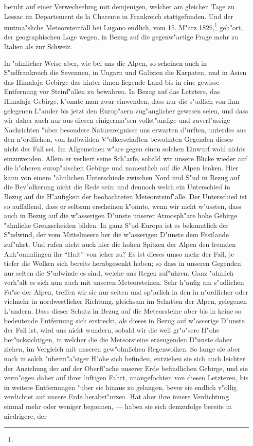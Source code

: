\documentclass[a4paper, 8pt, oneside, polutonikogreek, german]{article}
\begin{document}
beruht auf einer Verwechselung mit demjenigen, welcher am gleichen Tage zu Lessac im Departement de la Charente in Frankreich stattgefunden. Und der mutma"sliche Meteorsteinfall bei Lugano endlich, vom 15. M"arz 1826,\footnote{} geh"ort, der geographischen Lage wegen, in Bezug auf die gegenw"artige Frage mehr zu Italien als zur Schweiz.

In "ahnlicher Weise aber, wie bei uns die Alpen, so scheinen auch in S"udfrankreich die Sevennen, in Ungarn und Galizien die Karpaten, und in Asien das Himalaja-Gebirge das hinter ihnen liegende Land bis in eine gewisse Entfernung vor Steinf"allen zu bewahren. In Bezug auf das Letztere, das Himalaja-Gebirge, k"onnte man zwar einwenden, dass nur die s"udlich von ihm gelegenen L"ander bis jetzt den Europ"aern zug"anglicher gewesen seien, und dass wir daher auch nur aus diesen einigerma"sen vollst"andige und zuverl"assige Nachrichten "uber besondere Naturereignisse uns erwarten d"urften, unterdes aus den n"ordlichen, von halbwilden V"olkerschaften bewohnten Gegenden dieses nicht der Fall sei. Im Allgemeinen w"are gegen einen solchen Einwurf wohl nichts einzuwenden. Allein er verliert seine Sch"arfe, sobald wir unsere Blicke wieder auf die h"oheren europ"aischen Gebirge und namentlich auf die Alpen lenken. Hier kann von einem "ahnlichen Unterschiede zwischen Nord und S"ud in Bezug auf die Bev"olkerung nicht die Rede sein: und dennoch welch ein Unterschied in Bezug auf die H"aufigkeit der beobachteten Meteorsteinf"alle. Der Unterschied ist so auffallend, dass er seltsam erscheinen k"onnte, wenn wir nicht w"ussten, dass auch in Bezug auf die w"asserigen D"unste unserer Atmosph"are hohe Gebirge "ahnliche Grenzscheiden bilden. In ganz S"ud-Europa ist es bekanntlich der S"udwind, der vom Mittelmeere her die w"asserigen D"unste dem Festlande zuf"uhrt. Und rufen nicht auch hier die hohen Spitzen der Alpen den fremden Ank"ommlingen ihr "`Halt"' von jeher zu? Es ist dieses umso mehr der Fall, je tiefer die Wolken sich bereits herabgesenkt haben; so dass in unseren Gegenden nur selten die S"udwinde es sind, welche uns Regen zuf"uhren. Ganz "ahnlich verh"alt es sich nun auch mit unseren Meteorsteinen. Sehr h"aufig am s"udlichen Fu"se der Alpen, treffen wir sie nur selten und sp"arlich in den in n"ordlicher oder vielmehr in nordwestlicher Richtung, gleichsam im Schatten der Alpen, gelegenen L"andern. Dass dieser Schutz in Bezug auf die Meteorsteine aber bis in keine so bedeutende Entfernung sich erstreckt, als dieses in Bezug auf w"asserige D"unste der Fall ist, wird uns nicht wundern, sobald wir die weil gr"o"sere H"ohe ber"ucksichtigen, in welcher die die Meteorsteine erzeugenden D"unste daher ziehen, im Vergleich mit unseren gew"ohnlichen Regenwolken. So lange sie aber noch in solch "uberm"a"siger H"ohe sich befinden, entziehen sie sich auch leichter der Anziehung der auf der Oberfl"ache unserer Erde befindlichen Gebirge, und sie verm"ogen daher auf ihrer luftigen Fahrt, unangefochten von diesen Letzteren, bis in weitere Entfernungen "uber sie hinaus zu gelangen, bevor sie endlich v"ollig verdichtet auf unsere Erde herabst"urzen. Hat aber ihre innere Verdichtung einmal mehr oder weniger begonnen, --- haben sie sich demzufolge bereits in niedrigere, der 
\end{document}

